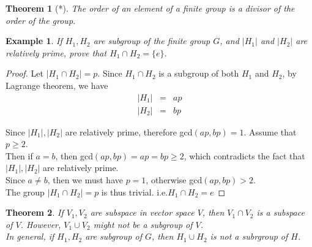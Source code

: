 \documentclass{article}
\theoremstyle{MyNonumberplain}
\theoremstyle{break}
\newtheorem*{proof}{Proof. }
\theoremstyle{break}
\newtheorem{theorem}{Theorem}[section]
\newtheorem{example}{Example}[section]
\theoremstyle{break}
\theoremstyle{definition}
\theoremstyle{break}
\begin{document}
\begin{thmbox}
    \begin{theorem}[*]
        The order of an element of a finite group is a divisor of the order of the group.
    \end{theorem}
\end{thmbox}

\begin{expbox}
    \begin{example}
        If $H_1, H_2$ are subgroup of the finite group $G$, and $| H_1 |$ and $| H_2
        |$ are relatively prime, prove that $H_1 \cap H_2 = \{ e \}$.
    \end{example}
    \begin{prfbox}
        \begin{proof}
            Let $|H_1\cap H_2|=p$. Since $H_1\cap H_2$ is a subgroup of both $H_1$ and $H_2$, by Lagrange theorem, we have 
            \begin{eqnarray*}
                |H_1| & = & ap\\
                |H_2| & = & bp
            \end{eqnarray*}

            Since $|H_1|,|H_2|$ are relatively prime, therefore gcd$(ap,bp)=1$. Assume that $p\geq 2$.\\

            Then if $a=b$, then gcd$(ap,bp)=ap=bp\geq2$, which contradicts the fact that $|H_1|,|H_2|$ are relatively prime.\\

            Since $a\neq b$, then we must have $p=1$, otherwise gcd$(ap,bp)>2$.\\

            The group $|H_1\cap H_2|=p$ is thus trivial. i.e.$H_1\cap H_2={e}$
        \end{proof}
    \end{prfbox}
\end{expbox}

\begin{thmbox}
    \begin{theorem}
        If $V_1, V_2$ are subspace in vector space $V$, then $V_1 \cap V_2$ is a
        subspace of $V$. However, $V_1 \cup V_2$ might not be a subgroup of $V$.\\

        In general, if $H_1, H_2$ are subgroup of $G$, then $H_1 \cup H_2$ is not a
        subrgroup of $H$.
    \end{theorem}
\end{thmbox}
\end{document}
